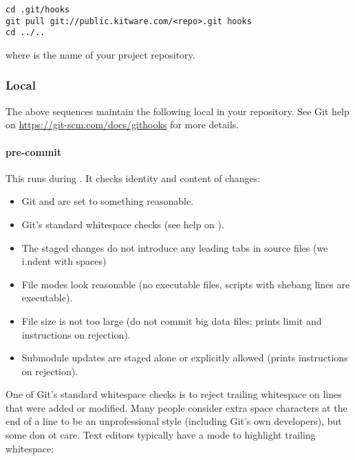 \begin{verbatim}
cd .git/hooks
git pull git://public.kitware.com/<repo>.git hooks
cd ../..
\end{verbatim}

where  is the name of your project repository.


\subsubsection{Local}
\label{subsubsec:Local}

The above sequences maintain the following local  in your
repository. See Git help on
\href{githooks}{https://git-scm.com/docs/githooks} for more details.


\paragraph{pre-commit}
\label{par:pre-commit}

This runs during . It checks identity and content of changes:
\begin{itemize}
\item Git  and  are set to something
reasonable.
\item Git's standard whitespace checks (see help on ).
\item The staged changes do not introduce any leading tabs in source files (we
i.ndent with spaces)
\item File modes look reasonable (no executable  files, scripts with
shebang lines are executable).
\item File size is not too large (do not commit big data files; prints limit and
instructions on rejection).
\item Submodule updates are staged alone or explicitly allowed (prints
instructions on rejection).
\end{itemize}

One of Git's standard whitespace checks is to reject trailing whitespace on
lines that were added or modified. Many people consider extra space characters
at the end of a line to be an unprofessional style (including Git's own
developers), but some don ot care. Text editors typically have a mode to
highlight trailing whitespace:

